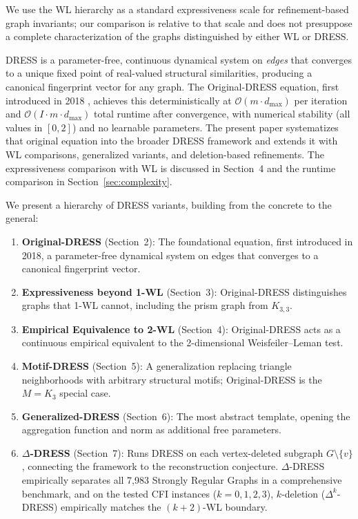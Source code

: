 \documentclass[11pt,a4paper]{article}
\begin{document}
We use the WL hierarchy as a standard expressiveness scale for refinement-based graph invariants; our comparison is relative to that scale and does not presuppose a complete characterization of the graphs distinguished by either WL or DRESS.

DRESS is a parameter-free, continuous dynamical system on \emph{edges} that converges to a unique fixed point of real-valued structural similarities, producing a canonical fingerprint vector for any graph. The Original-DRESS equation, first introduced in 2018 \cite{castrillo2018dynamicstructuralsimilaritygraphs}, achieves this deterministically at $\mathcal{O}(m \cdot d_{\max})$ per iteration and $\mathcal{O}(I \cdot m \cdot d_{\max})$ total runtime after convergence, with numerical stability (all values in $[0,2]$) and no learnable parameters. The present paper systematizes that original equation into the broader DRESS framework and extends it with WL comparisons, generalized variants, and deletion-based refinements. The expressiveness comparison with WL is discussed in Section~4 and the runtime comparison in Section~\ref{sec:complexity}.

We present a hierarchy of DRESS variants, building from the concrete to the general:
\begin{enumerate}
    \item \textbf{Original-DRESS} (Section~2): The foundational equation, first introduced in 2018, a parameter-free dynamical system on edges that converges to a canonical fingerprint vector.
    \item \textbf{Expressiveness beyond 1-WL} (Section~3): Original-DRESS distinguishes graphs that 1-WL cannot, including the prism graph from $K_{3,3}$.
    \item \textbf{Empirical Equivalence to 2-WL} (Section~4): Original-DRESS acts as a continuous empirical equivalent to the 2-dimensional Weisfeiler--Leman test.
    \item \textbf{Motif-DRESS} (Section~5): A generalization replacing triangle neighborhoods with arbitrary structural motifs; Original-DRESS is the $M = K_3$ special case.
    \item \textbf{Generalized-DRESS} (Section~6): The most abstract template, opening the aggregation function and norm as additional free parameters.
    \item \textbf{$\Delta$-DRESS} (Section~7): Runs DRESS on each vertex-deleted subgraph $G \setminus \{v\}$, connecting the framework to the reconstruction conjecture. $\Delta$-DRESS empirically separates all 7{,}983 Strongly Regular Graphs in a comprehensive benchmark, and on the tested CFI instances ($k = 0,1,2,3$), $k$-deletion ($\Delta^k$-DRESS) empirically matches the $(k{+}2)$-WL boundary.
\end{enumerate}
\end{document}
